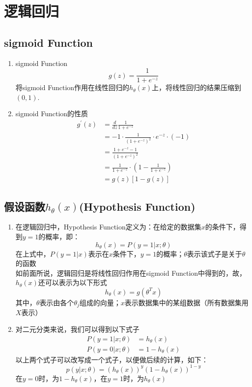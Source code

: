 \section{逻辑回归}
\subsection{sigmoid Function}
\begin{enumerate}
	\item sigmoid Function
	\begin{equation}
		g(z) = \frac{1}{1+e^{-z}}
	\end{equation}
	将sigmoid Function作用在线性回归的$h_\theta(x)$上，将线性回归的结果压缩到$(0,1)$.
	\item sigmoid Function的性质
	\begin{align}
		g^{'}{(z)} &= \frac{d}{dz}\frac{1}{1+e^{-z}} \\
		&= -1 \cdot \frac{1}{(1+e^{-z})^2} \cdot e^{-z} \cdot (-1) \\
		&= \frac{1+e^{-z} - 1}{(1+e^{-z})^2} \\
		&= \frac{1}{1+e^{-z}} \cdot \left( 1- \frac{1}{1+e^{-z}} \right) \\
		&= g(z)\left[1-g(z)\right]
	\end{align}
\end{enumerate}

\subsection{假设函数$h_\theta(x)$(Hypothesis Function)}
\begin{enumerate}
	\item 在逻辑回归中，Hypothesis Function定义为：在给定的数据集$x$的条件下，得到$y=1$的概率，即：
	\begin{equation}
		h_\theta(x) = P(y=1|x; \theta)
	\end{equation}
	在上式中，$P(y=1|x)$表示在$x$条件下，$y=1$的概率；$\theta$表示该式子是关于$\theta$的函数 \\
	如前面所说，逻辑回归是将线性回归作用在sigmoid Function中得到的，故，$h_\theta(x)$还可以表示为以下形式
	\begin{equation}
		h_\theta(x) = g(\theta^Tx)
	\end{equation}
	其中，$\theta$表示由各个$\theta_j$组成的向量；$x$表示数据集中的某组数据（所有数据集用$X$表示）

	\item 对二元分类来说，我们可以得到以下式子
	\begin{align}
		P(y=1|x;\theta) &= h_\theta(x) \\
		P(y=0|x;\theta) &= 1- h_\theta(x)
	\end{align}
	以上两个式子可以改写成一个式子，以便做后续的计算，如下：
	\begin{equation}
		p(y|x;\theta) = \left( h_\theta(x) \right)^y \left( 1-h_\theta(x) \right)^{1-y}
	\end{equation}
	在$y=0$时，为$1- h_\theta(x)$，在$y=1$时，为$h_\theta(x)$
\end{enumerate}

